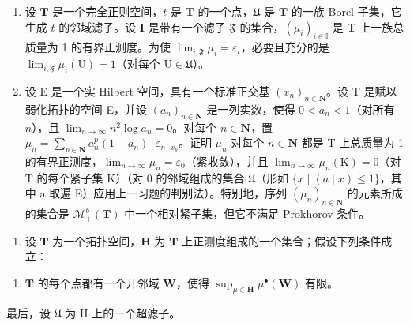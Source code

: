 \begin{enumerate}
\def\labelenumi{\arabic{enumi})}
\setcounter{enumi}{3}
\item
  设 \(\mathbf{T}\) 是一个完全正则空间，\(t\) 是 \(\mathbf{T}\) 的一个点，\(\mathfrak{U}\) 是 \(\mathbf{T}\) 的一族 Borel 子集，它生成 \(t\) 的邻域滤子。设 \(\mathbf{I}\) 是带有一个滤子 \(\mathfrak{F}\) 的集合，\((\mu_i)_{i \in \mathbb{I}}\) 是 \(\mathbf{T}\) 上一族总质量为 1 的有界正测度。为使 \(\lim_{i, \mathfrak{F}} \mu_i = \varepsilon_t\)，必要且充分的是 \(\lim_{i, \mathfrak{F}} \mu_i(\mathrm{U}) = 1\)（对每个 \(\mathrm{U} \in \mathfrak{U}\)）。
\item
  设 E 是一个实 Hilbert 空间，具有一个标准正交基 \((x_{n})_{n\in \mathbf{N}}\)。设 T 是赋以弱化拓扑的空间 E，并设 \((a_{n})_{n\in \mathbf{N}}\) 是一列实数，使得 \(0 < a_{n} < 1\)（对所有 \(n\)），且 \(\lim_{n\to \infty}n^2\log a_n = 0\)。对每个 \(n\in \mathbf{N}\)，置 \(\mu_{n} = \sum_{p\in \mathbf{N}}a_{n}^{p}(1 - a_{n})\cdot \varepsilon_{n\cdot x_{p}}\)。证明 \(\mu_{n}\) 对每个 \(n \in \mathbf{N}\) 都是 T 上总质量为 1 的有界正测度，\(\lim_{n\to\infty}\mu_{n}=\varepsilon_{0}\)（紧收敛），并且 \(\lim_{n\to\infty}\mu_{n}(\mathrm{K})=0\)（对 T 的每个紧子集 \(\mathrm{K}\)）（对 0 的邻域组成的集合 \(\mathfrak{U}\)（形如 \(\{x \mid (a \mid x) \leqslant 1\}\)，其中 a 取遍 E）应用上一习题的判别法）。特别地，序列 \((\mu_{n})_{n \in \mathbf{N}}\) 的元素所成的集合是 \(\mathcal{M}_{+}^{b}(\mathbf{T})\) 中一个相对紧子集，但它不满足 Prokhorov 条件。
\end{enumerate}


\begin{enumerate}
\def\labelenumi{\arabic{enumi})}
\setcounter{enumi}{5}
\tightlist
\item
  设 \(\mathbf{T}\) 为一个拓扑空间，\(\mathbf{H}\) 为 \(\mathbf{T}\) 上正测度组成的一个集合；假设下列条件成立：
\end{enumerate}

\begin{enumerate}
\def\labelenumi{(\Alph{enumi})}
\setcounter{enumi}{21}
\tightlist
\item
  \(\mathbf{T}\) 的每个点都有一个开邻域 \(\mathbf{W}\)，使得 \(\sup_{\mu \in \mathbf{H}} \mu^{\bullet}(\mathbf{W})\) 有限。
\end{enumerate}

最后，设 \(\mathfrak{U}\) 为 H 上的一个超滤子。

